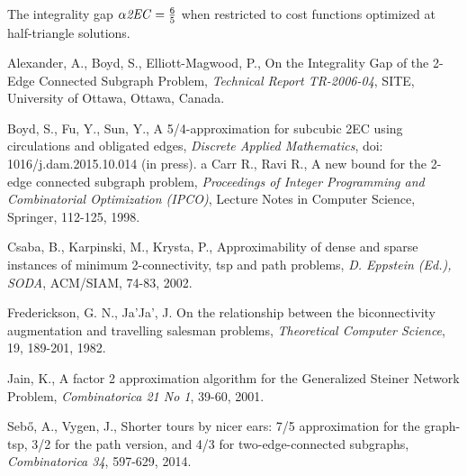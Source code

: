 \documentclass[oneeqnum,final]{siamltex1213}
\newcommand{\TwoEC}{\emph{2EC}}
\newcommand{\alphaTwoEC}{\ensuremath{\alpha\text{\TwoEC}}}
\begin{document}
\begin{corollary}
The integrality gap $\alphaTwoEC=\frac{6}{5}$ when restricted to cost functions optimized at half-triangle solutions.
\end{corollary}

\begin{thebibliography}{10}\label{bibliography}

 Alexander, A., Boyd, S., Elliott-Magwood, P., On the Integrality Gap of the 2-Edge Connected Subgraph Problem,  \emph{Technical Report TR-2006-04}, SITE, University of Ottawa, Ottawa, Canada.

 Boyd, S., Fu, Y., Sun, Y., A 5/4-approximation for subcubic 2EC using circulations and obligated edges, \emph{Discrete Applied Mathematics}, doi:\,1016/j.dam.2015.10.014 (in press).
a
 Carr R., Ravi R., A new bound for the 2-edge connected subgraph problem, \emph{Proceedings of Integer Programming and Combinatorial Optimization (IPCO)}, Lecture Notes in Computer Science, Springer, 112-125, 1998.

 Csaba, B., Karpinski, M., Krysta, P., Approximability of dense and sparse instances of minimum 2-connectivity, tsp and path problems, \emph{D. Eppstein (Ed.),
SODA}, ACM/SIAM, 74-83, 2002.

 Frederickson, G. N., Ja'Ja', J. On the relationship between the biconnectivity augmentation and travelling salesman problems, \emph{Theoretical Computer Science}, 19, 189-201, 1982.

 Jain, K., A factor 2 approximation algorithm for the Generalized Steiner Network Problem, \emph{Combinatorica 21 No 1}, 39-60, 2001.

 Sebő, A., Vygen, J., Shorter tours by nicer ears: 7/5 approximation for the graph-tsp, 3/2 for the path version, and 4/3 for two-edge-connected subgraphs, \emph{Combinatorica 34}, 597-629, 2014.

\end{thebibliography}
\end{document}
